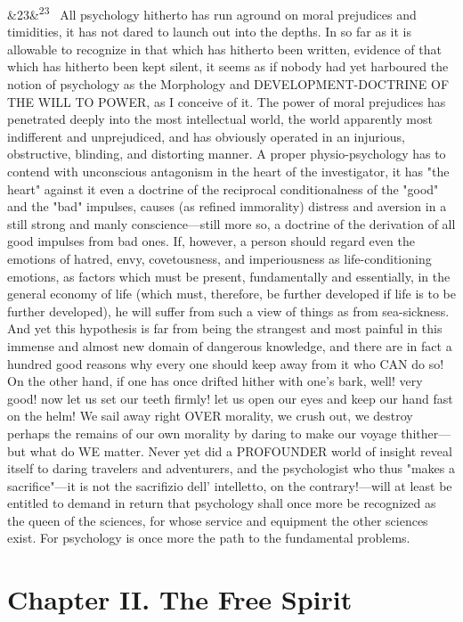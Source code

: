 \documentclass[12pt]{article}
\newcommand{\para}[1][]{\par\noindent\ifx&#1&\else\textsuperscript{\footnotesize #1}~\fi}
\begin{document}
\para[23] All psychology hitherto has run aground on moral prejudices and timidities, it has not dared to launch out into the depths. In so far as it is allowable to recognize in that which has hitherto been written, evidence of that which has hitherto been kept silent, it seems as if nobody had yet harboured the notion of psychology as the Morphology and DEVELOPMENT-DOCTRINE OF THE WILL TO POWER, as I conceive of it. The power of moral prejudices has penetrated deeply into the most intellectual world, the world apparently most indifferent and unprejudiced, and has obviously operated in an injurious, obstructive, blinding, and distorting manner. A proper physio-psychology has to contend with unconscious antagonism in the heart of the investigator, it has "the heart" against it even a doctrine of the reciprocal conditionalness of the "good" and the "bad" impulses, causes (as refined immorality) distress and aversion in a still strong and manly conscience---still more so, a doctrine of the derivation of all good impulses from bad ones. If, however, a person should regard even the emotions of hatred, envy, covetousness, and imperiousness as life-conditioning emotions, as factors which must be present, fundamentally and essentially, in the general economy of life (which must, therefore, be further developed if life is to be further developed), he will suffer from such a view of things as from sea-sickness. And yet this hypothesis is far from being the strangest and most painful in this immense and almost new domain of dangerous knowledge, and there are in fact a hundred good reasons why every one should keep away from it who CAN do so! On the other hand, if one has once drifted hither with one's bark, well! very good! now let us set our teeth firmly! let us open our eyes and keep our hand fast on the helm! We sail away right OVER morality, we crush out, we destroy perhaps the remains of our own morality by daring to make our voyage thither---but what do WE matter. Never yet did a PROFOUNDER world of insight reveal itself to daring travelers and adventurers, and the psychologist who thus "makes a sacrifice"---it is not the sacrifizio dell' intelletto, on the contrary!---will at least be entitled to demand in return that psychology shall once more be recognized as the queen of the sciences, for whose service and equipment the other sciences exist. For psychology is once more the path to the fundamental problems.

\section*{Chapter II. The Free Spirit}
\end{document}
